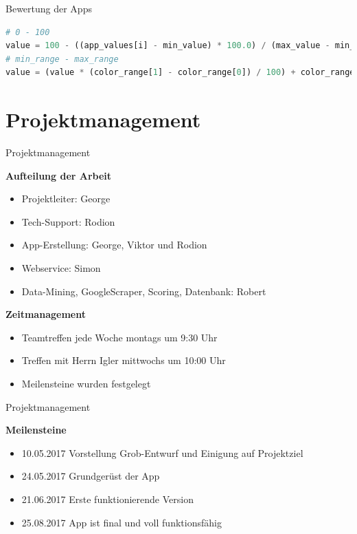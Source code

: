\documentclass[compress,t]{beamer}
\begin{document}
\begin{frame}[fragile]{Bewertung der Apps}
    \begin{lstlisting}[language=Python]
# 0 - 100
value = 100 - ((app_values[i] - min_value) * 100.0) / (max_value - min_value)
# min_range - max_range
value = (value * (color_range[1] - color_range[0]) / 100) + color_range[0]
    \end{lstlisting}

\end{frame}

\section{Projektmanagement}

\begin{frame}{Projektmanagement}


    \textbf{Aufteilung der Arbeit}
     \begin{itemize}
          \item Projektleiter: George
          \item Tech-Support: Rodion
          \item App-Erstellung: George, Viktor und Rodion
          \item Webservice: Simon
          \item Data-Mining, GoogleScraper, Scoring, Datenbank: Robert
     \end{itemize}
    \textbf{Zeitmanagement}
        \begin{itemize}
          \item Teamtreffen jede Woche montags um 9:30 Uhr
          \item Treffen mit Herrn Igler mittwochs um 10:00 Uhr
          \item Meilensteine wurden festgelegt
        \end{itemize}

\end{frame}
\begin{frame}{Projektmanagement}

    \textbf{Meilensteine}
     \begin{itemize}
          \item 10.05.2017 Vorstellung Grob-Entwurf und Einigung auf Projektziel
          \item 24.05.2017 Grundgerüst der App
          \item 21.06.2017 Erste funktionierende Version
          \item 25.08.2017 App ist final und voll funktionsfähig
    \end{itemize}

\end{frame}
\end{document}
